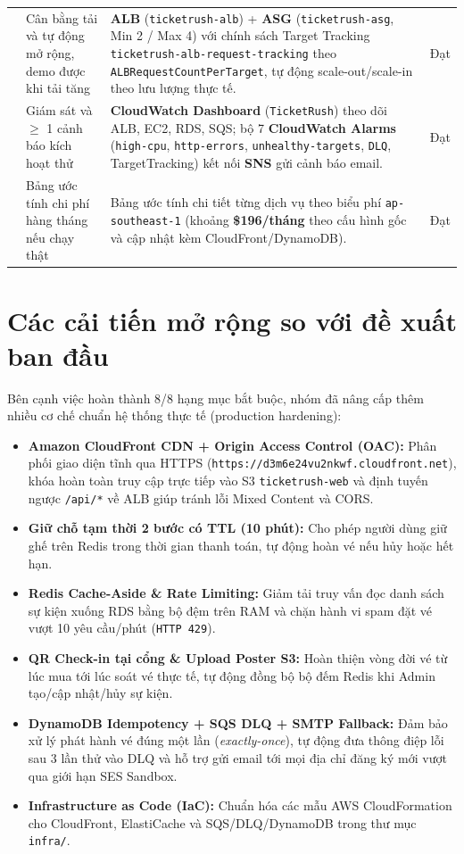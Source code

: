 {\begin{longtable}{c >{\raggedright\arraybackslash}p{3.4cm} >{\raggedright\arraybackslash}p{8.7cm} c}
  \addlinespace[6pt]
  6 & Cân bằng tải và tự động mở rộng, demo được khi tải tăng &
    \textbf{ALB} (\texttt{ticketrush-alb}) + \textbf{ASG} (\texttt{ticketrush-asg}, Min 2 / Max 4) với chính sách Target Tracking \texttt{ticketrush-alb-request-tracking} theo \texttt{ALBRequestCountPerTarget}, tự động scale-out/scale-in theo lưu lượng thực tế. & Đạt \\
  \addlinespace[6pt]
  7 & Giám sát và $\ge$ 1 cảnh báo kích hoạt thử &
    \textbf{CloudWatch Dashboard} (\texttt{TicketRush}) theo dõi ALB, EC2, RDS, SQS; bộ 7 \textbf{CloudWatch Alarms} (\texttt{high-cpu}, \texttt{http-errors}, \texttt{unhealthy-targets}, \texttt{DLQ}, TargetTracking) kết nối \textbf{SNS} gửi cảnh báo email. & Đạt \\
  \addlinespace[6pt]
  8 & Bảng ước tính chi phí hàng tháng nếu chạy thật &
    Bảng ước tính chi tiết từng dịch vụ theo biểu phí \texttt{ap-southeast-1} (khoảng \textbf{\$196/tháng} theo cấu hình gốc và cập nhật kèm CloudFront/DynamoDB). & Đạt \\
\end{longtable}
}

\section{Các cải tiến mở rộng so với đề xuất ban đầu}
Bên cạnh việc hoàn thành 8/8 hạng mục bắt buộc, nhóm đã nâng cấp thêm nhiều cơ chế chuẩn hệ thống thực tế (production hardening):
\begin{itemize}[leftmargin=1.5em]
  \item \textbf{Amazon CloudFront CDN + Origin Access Control (OAC):} Phân phối giao diện tĩnh qua HTTPS (\texttt{https://d3m6e24vu2nkwf.cloudfront.net}), khóa hoàn toàn truy cập trực tiếp vào S3 \texttt{ticketrush-web} và định tuyến ngược \texttt{/api/*} về ALB giúp tránh lỗi Mixed Content và CORS.
  \item \textbf{Giữ chỗ tạm thời 2 bước có TTL (10 phút):} Cho phép người dùng giữ ghế trên Redis trong thời gian thanh toán, tự động hoàn vé nếu hủy hoặc hết hạn.
  \item \textbf{Redis Cache-Aside \& Rate Limiting:} Giảm tải truy vấn đọc danh sách sự kiện xuống RDS bằng bộ đệm trên RAM và chặn hành vi spam đặt vé vượt 10 yêu cầu/phút (\texttt{HTTP 429}).
  \item \textbf{QR Check-in tại cổng \& Upload Poster S3:} Hoàn thiện vòng đời vé từ lúc mua tới lúc soát vé thực tế, tự động đồng bộ bộ đếm Redis khi Admin tạo/cập nhật/hủy sự kiện.
  \item \textbf{DynamoDB Idempotency + SQS DLQ + SMTP Fallback:} Đảm bảo xử lý phát hành vé đúng một lần (\textit{exactly-once}), tự động đưa thông điệp lỗi sau 3 lần thử vào DLQ và hỗ trợ gửi email tới mọi địa chỉ đăng ký mới vượt qua giới hạn SES Sandbox.
  \item \textbf{Infrastructure as Code (IaC):} Chuẩn hóa các mẫu AWS CloudFormation cho CloudFront, ElastiCache và SQS/DLQ/DynamoDB trong thư mục \texttt{infra/}.
\end{itemize}
